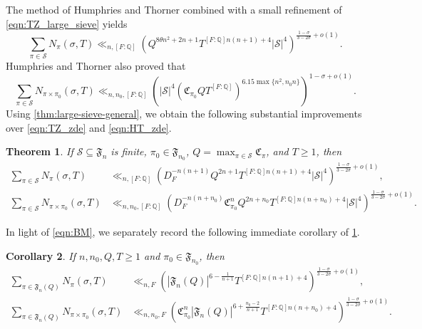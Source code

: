 \documentclass[11pt]{amsart}
\newtheorem{theorem}{Theorem}[section]
\newtheorem{corollary}[theorem]{Corollary}
\theoremstyle{remark}
\numberwithin{equation}{section}
\newcommand{\Q}{\mathbb{Q}}
\begin{document}
The method of Humphries and Thorner \cite{humphries2024zeros} combined with a small refinement of \eqref{eqn:TZ_large_sieve} yields
\begin{equation}
\label{eqn:TZ_zde}
\sum_{\pi\in\mathcal{S}}N_{\pi}(\sigma,T)\ll_{n,[F:\Q]}(Q^{8\theta n^2+2n+1}T^{[F:\Q]n(n+1)+4}|\mathcal{S}|^4)^{\frac{1-\sigma}{3-2\sigma}+o(1)}.
\end{equation}
Humphries and Thorner \cite[Theorem 1.1]{humphries2024zeros} also proved that
\begin{equation}
\label{eqn:HT_zde}
\sum_{\pi\in\mathcal{S}}N_{\pi\times\pi_0}(\sigma,T)\ll_{n,n_0,[F:\Q]}(|\mathcal{S}|^4 (\mathfrak{C}_{\pi_0}QT^{[F:\Q]})^{6.15\max\{n^2,n_0 n\}})^{1-\sigma+o(1)}.
\end{equation}
Using \cref{thm:large-sieve-general}, we obtain the following substantial improvements over \eqref{eqn:TZ_zde} and \eqref{eqn:HT_zde}.
\begin{theorem}
\label{thm:ZDE}
If $\mathcal{S}\subseteq\mathfrak{F}_n$ is finite, $\pi_0\in\mathfrak{F}_{n_0}$, $Q=\max_{\pi\in\mathcal{S}}\mathfrak{C}_{\pi}$, and $T\geq 1$, then
\begin{align*}
\sum_{\pi\in\mathcal{S}}N_{\pi}(\sigma,T)&\ll_{n,[F:\Q]}(D_F^{-n(n+1)}Q^{2n+1}T^{[F:\Q]n(n+1)+4}|\mathcal{S}|^4)^{\frac{1-\sigma}{3-2\sigma}+o(1)},\\
\sum_{\pi\in\mathcal{S}}N_{\pi\times\pi_0}(\sigma,T)&\ll_{n,n_0,[F:\Q]}(D_F^{-n(n+n_0)}\mathfrak{C}_{\pi_0}^{n}Q^{2n+n_0}T^{[F:\Q]n(n+n_0)+4}|\mathcal{S}|^4)^{\frac{1-\sigma}{3-2\sigma}+o(1)}.
\end{align*}
\end{theorem}

In light of \eqref{eqn:BM}, we separately record the following immediate corollary of \cref{thm:ZDE}.

\begin{corollary}
\label{cor:full_family}
If $n,n_0,Q,T\geq 1$ and $\pi_0\in\mathfrak{F}_{n_0}$, then
\begin{align*}
\sum_{\pi\in\mathfrak{F}_n(Q)}N_{\pi}(\sigma,T)&\ll_{n,F}(|\mathfrak{F}_n(Q)|^{6-\frac{1}{n+1}}T^{[F:\Q]n(n+1)+4})^{\frac{1-\sigma}{3-2\sigma}+o(1)},\\
\sum_{\pi\in\mathfrak{F}_n(Q)}N_{\pi\times\pi_0}(\sigma,T)&\ll_{n,n_0,F}(\mathfrak{C}_{\pi_0}^{n}|\mathfrak{F}_n(Q)|^{6+\frac{n_0-2}{n+1}}T^{[F:\Q]n(n+n_0)+4})^{\frac{1-\sigma}{3-2\sigma}+o(1)}.
\end{align*}
\end{corollary}
\end{document}
